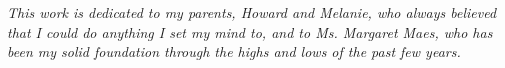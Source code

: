 

\copyrightpage

\begin{dedication}
  \emph{This work is dedicated to my parents, Howard and Melanie, who always
believed that I could do anything I set my mind to, and to Ms. Margaret Maes,
who has been my solid foundation through the highs and lows of the past few
years.}
\end{dedication}



\pagestyle{deposit}


\begin{acks}

\end{acks}

\renewcommand{\printtoctitle}[1]{\chapter*{#1}}
\renewcommand{\printloftitle}[1]{\chapter*{#1}}
\renewcommand{\printlottitle}[1]{\chapter*{#1}}

\renewcommand{\tocmark}{}
\renewcommand{\lofmark}{}
\renewcommand{\lotmark}{}

\renewcommand{\tocheadstart}{}
\renewcommand{\lofheadstart}{}
\renewcommand{\lotheadstart}{}

\renewcommand{\aftertoctitle}{}
\renewcommand{\afterloftitle}{}
\renewcommand{\afterlottitle}{}

